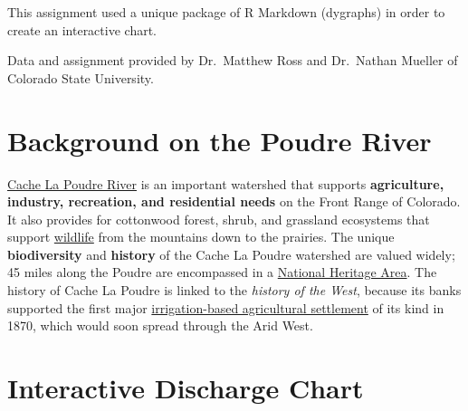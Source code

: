\documentclass[
]{book}
\begin{document}
This assignment used a unique package of R Markdown (dygraphs) in order to create an interactive chart.

Data and assignment provided by Dr.~Matthew Ross and Dr.~Nathan Mueller of Colorado State University.

\hypertarget{background-on-the-poudre-river}{%
\section{Background on the Poudre River}\label{background-on-the-poudre-river}}

\href{https://edits.nationalmap.gov/apps/gaz-domestic/public/summary/205018}{Cache La Poudre River} is an important watershed that supports \textbf{agriculture, industry, recreation, and residential needs} on the Front Range of Colorado. It also provides for cottonwood forest, shrub, and grassland ecosystems that support \href{http://poudretrail.org/habitat-wildlife/\#fish}{wildlife} from the mountains down to the prairies. The unique \textbf{biodiversity} and \textbf{history} of the Cache La Poudre watershed are valued widely; 45 miles along the Poudre are encompassed in a \href{https://www.nps.gov/places/cache-la-poudre-river-national-heritage-area.htm}{National Heritage Area}.
The history of Cache La Poudre is linked to the \emph{history of the West}, because its banks supported the first major \href{https://www-jstor-org.ezproxy2.library.colostate.edu/stable/pdf/1821074.pdf}{irrigation-based agricultural settlement} of its kind in 1870, which would soon spread through the Arid West.

\hypertarget{interactive-discharge-chart}{%
\section{Interactive Discharge Chart}\label{interactive-discharge-chart}}
\end{document}
